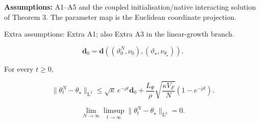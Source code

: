 \documentclass[11pt,a4paper]{report}
\begin{document}
\textbf{Assumptions:} A1–A5 and the coupled initialisation/\allowbreak{}native interacting solution of Theorem 3. The parameter map is the Euclidean coordinate projection.

Extra assumptions: Extra A1; also Extra A3 in the linear-growth branch.



\[\mathbf d_0=\mathbf d((\vartheta_0^N,\nu_0),(\vartheta_\star,\nu_{\theta_\star})).\]







For every \(t\ge0\),





\[\|\theta_t^N-\theta_\star\|_{\mathrm L^2}\le\sqrt\kappa\,e^{-\rho t}\mathbf d_0+\frac{L_\Psi}{\rho}\sqrt{\frac{\kappa V_F}{N}}(1-e^{-\rho t}).\]





\[\lim_{N\to\infty}\limsup_{t\to\infty}\|\theta_t^N-\theta_\star\|_{\mathrm L^2}=0.\]
\end{document}
